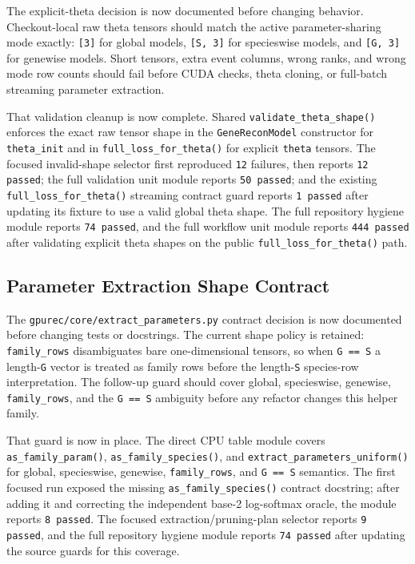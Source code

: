 \documentclass[11pt]{article}
\begin{document}
The explicit-theta decision is now documented before changing behavior.
Checkout-local raw theta tensors should match the active parameter-sharing mode
exactly: \texttt{[3]} for global models, \texttt{[S, 3]} for specieswise
models, and \texttt{[G, 3]} for genewise models.  Short tensors, extra event
columns, wrong ranks, and wrong mode row counts should fail before CUDA checks,
theta cloning, or full-batch streaming parameter extraction.

That validation cleanup is now complete.  Shared
\texttt{validate\_theta\_shape()} enforces the exact raw tensor shape in the
\texttt{GeneReconModel} constructor for \texttt{theta\_init} and in
\texttt{full\_loss\_for\_theta()} for explicit \texttt{theta} tensors.  The
focused invalid-shape selector first reproduced \texttt{12} failures, then
reports \texttt{12 passed}; the full validation unit module reports
\texttt{50 passed}; and the existing \texttt{full\_loss\_for\_theta()} streaming
contract guard reports \texttt{1 passed} after updating its fixture to use a
valid global theta shape.
The full repository hygiene module reports \texttt{74 passed}, and the full
workflow unit module reports \texttt{444 passed} after validating explicit theta
shapes on the public \texttt{full\_loss\_for\_theta()} path.

\subsection{Parameter Extraction Shape Contract}

The \texttt{gpurec/core/extract\_parameters.py} contract decision is now
documented before changing tests or docstrings.  The current shape policy is
retained: \texttt{family\_rows} disambiguates bare one-dimensional tensors, so
when \texttt{G == S} a length-\texttt{G} vector is treated as family rows before
the length-\texttt{S} species-row interpretation.  The follow-up guard should
cover global, specieswise, genewise, \texttt{family\_rows}, and the
\texttt{G == S} ambiguity before any refactor changes this helper family.

That guard is now in place.  The direct CPU table module covers
\texttt{as\_family\_param()}, \texttt{as\_family\_species()}, and
\texttt{extract\_parameters\_uniform()} for global, specieswise, genewise,
\texttt{family\_rows}, and \texttt{G == S} semantics.  The first focused run
exposed the missing \texttt{as\_family\_species()} contract docstring; after
adding it and correcting the independent base-2 log-softmax oracle, the module
reports \texttt{8 passed}.
The focused extraction/pruning-plan selector reports \texttt{9 passed}, and the
full repository hygiene module reports \texttt{74 passed} after updating the
source guards for this coverage.
\end{document}
